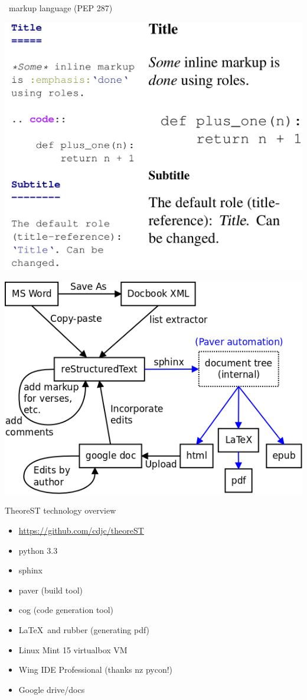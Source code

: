 \documentclass{beamer}
\begin{document}
\begin{frame}{\rst\ markup language (PEP 287)}
\centerline{\includegraphics[keepaspectratio=true, width=\paperwidth, height=0.9\paperheight]{rst_example.png}}
\end{frame}

\begin{frame}
    \centerline{\includegraphics[keepaspectratio=true, width=\paperwidth]{theorest_process.png}}
\end{frame}


\begin{frame}[fragile]{TheoreST technology overview}
\begin{itemize}
\item \url{https://github.com/cdjc/theoreST}
\item python 3.3
\item sphinx
\item paver (build tool)
\item cog (code generation tool)
\item \LaTeX\  and rubber (generating pdf)
\item Linux Mint 15 virtualbox VM
\item Wing IDE Professional (thanks nz pycon!)
\item Google drive/docs
\end{itemize}
\end{frame}
\end{document}
